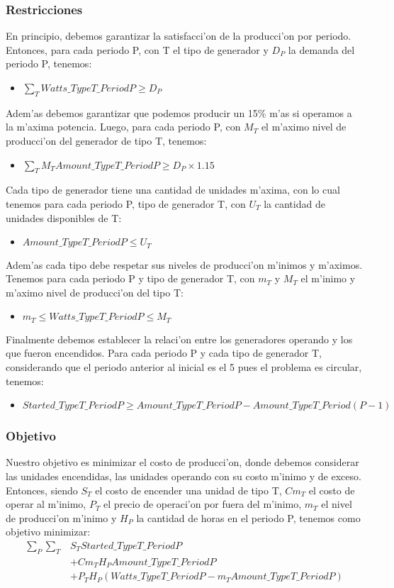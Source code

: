 \subsubsection{Restricciones}
En principio, debemos garantizar la satisfacci'on de la producci'on por periodo. Entonces, para cada periodo P, con T el tipo de generador y $D_{P}$ la demanda del periodo P, tenemos:
\begin{itemize}
\item $\sum_{T}Watts\_TypeT\_PeriodP \geq D_{P}$
\end{itemize}
Adem'as debemos garantizar que podemos producir un 15\% m'as si operamos a la m'axima potencia. Luego, para cada periodo P, con $M_{T}$ el m'aximo nivel de producci'on del generador de tipo T, tenemos:
\begin{itemize}
\item $\sum_{T} M_{T} Amount\_TypeT\_PeriodP \geq D_{P} \times 1.15$
\end{itemize}
Cada tipo de generador tiene una cantidad de unidades m'axima, con lo cual tenemos para cada periodo P, tipo de generador T, con $U_{T}$ la cantidad de unidades disponibles de T:
\begin{itemize}
\item $Amount\_TypeT\_PeriodP \leq U_{T}$
\end{itemize}
Adem'as cada tipo debe respetar sus niveles de producci'on m'inimos y m'aximos. Tenemos para cada periodo P y tipo de generador T, con $m_{T}$ y $M_{T}$ el m'inimo y m'aximo nivel de producci'on del tipo T:
\begin{itemize}
\item $m_{T} \leq Watts\_TypeT\_PeriodP \leq M_{T}$
\end{itemize}
Finalmente debemos establecer la relaci'on entre los generadores operando y los que fueron encendidos. Para cada periodo P y cada tipo de generador T, considerando que el periodo anterior al inicial es el 5 pues el problema es circular, tenemos:
\begin{itemize}
\item $Started\_TypeT\_PeriodP \geq Amount\_TypeT\_PeriodP - Amount\_TypeT\_Period(P-1)$
\end{itemize}
\subsubsection{Objetivo}
Nuestro objetivo es minimizar el costo de producci'on, donde debemos considerar las unidades encendidas, las unidades operando con su costo m'inimo y de exceso. Entonces, siendo $S_{T}$ el costo de encender una unidad de tipo T, $Cm_{T}$ el costo de operar al m'inimo, $P_{T}$ el precio de operaci'on por fuera del m'inimo, $m_{T}$ el nivel de producci'on m'inimo y $H_{P}$ la cantidad de horas en el periodo P, tenemos como objetivo minimizar:
\begin{equation}
\begin{aligned}
\sum_{P} \sum_{T} 	& S_{T} Started\_TypeT\_PeriodP \\
				& + Cm_{T} H_{P} Amount\_TypeT\_PeriodP \\
 				& + P_{T} H_{P} (Watts\_TypeT\_PeriodP - m_{T} Amount\_TypeT\_PeriodP)
\end{aligned}
\end{equation}
